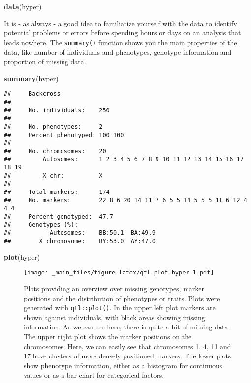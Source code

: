 \documentclass[12pt,]{krantz}
\newenvironment{Shaded}{\begin{snugshade}}{\end{snugshade}}
\newcommand{\KeywordTok}[1]{\textcolor[rgb]{0.27,0.27,0.27}{\textbf{#1}}}
\newcommand{\NormalTok}[1]{#1}
\theoremstyle{definition}
\theoremstyle{definition}
\theoremstyle{definition}
\theoremstyle{remark}
\begin{document}
\begin{Shaded}
\begin{Highlighting}[]
\KeywordTok{data}\NormalTok{(hyper)}
\end{Highlighting}
\end{Shaded}

It is - as always - a good idea to familiarize yourself with the data to
identify potential problems or errors before spending hours or days on
an analysis that leads nowhere. The \texttt{summary()} function shows
you the main properties of the data, like number of individuals and
phenotypes, genotype information and proportion of missing data.

\begin{Shaded}
\begin{Highlighting}[]
\KeywordTok{summary}\NormalTok{(hyper)}
\end{Highlighting}
\end{Shaded}

\begin{verbatim}
##     Backcross
## 
##     No. individuals:    250 
## 
##     No. phenotypes:     2 
##     Percent phenotyped: 100 100 
## 
##     No. chromosomes:    20 
##         Autosomes:      1 2 3 4 5 6 7 8 9 10 11 12 13 14 15 16 17 18 19 
##         X chr:          X 
## 
##     Total markers:      174 
##     No. markers:        22 8 6 20 14 11 7 6 5 5 14 5 5 5 11 6 12 4 4 4 
##     Percent genotyped:  47.7 
##     Genotypes (%):    
##           Autosomes:    BB:50.1  BA:49.9 
##        X chromosome:    BY:53.0  AY:47.0
\end{verbatim}

\begin{Shaded}
\begin{Highlighting}[]
\KeywordTok{plot}\NormalTok{(hyper)}
\end{Highlighting}
\end{Shaded}

\begin{figure}
\centering
\texttt{[image: \_main\_files/figure-latex/qtl-plot-hyper-1.pdf]}
\caption{\label{fig:qtl-plot-hyper}Plots providing an overview over missing
genotypes, marker positions and the distribution of phenotypes or
traits. Plots were generated with \texttt{qtl::plot()}. In the upper
left plot markers are shown against individuals, with black areas
showing missing information. As we can see here, there is quite a bit of
missing data. The upper right plot shows the marker positions on the
chromosomes. Here, we can easily see that chromosomes 1, 4, 11 and 17
have clusters of more densely positioned markers. The lower plots show
phenotype information, either as a histogram for continuous values or as
a bar chart for categorical factors.}
\end{figure}
\end{document}
